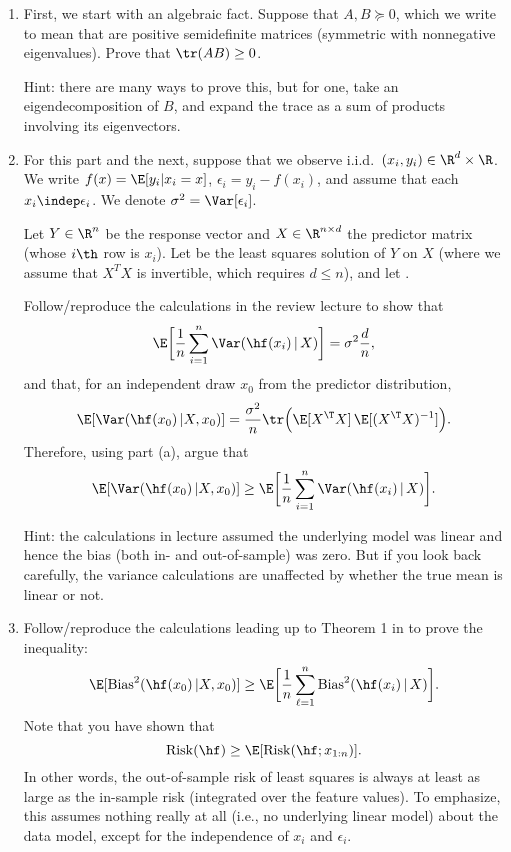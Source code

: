 \documentclass{article}
\begin{document}
\begin{enumerate}[label=(\alph*)]
\item First, we start with an algebraic fact. Suppose that $A,B \succeq 0$, 
  which we write to mean that are positive semidefinite matrices (symmetric with
  nonnegative eigenvalues). Prove that $\tr(AB) \geq 0$. 
  \marginpar{\small [2 pts]} 

  Hint: there are many ways to prove this, but for one, take an
  eigendecomposition of $B$, and expand the trace as a sum of products involving
  its eigenvectors. 

\item For this part and the next, suppose that we observe i.i.d.\ $(x_i,y_i) \in
  \R^d \times \R$. We write $f(x) = \E[y_i|x_i = x]$, $\epsilon_i = y_i -
  f(x_i)$, and assume that each $x_i \indep \epsilon_i$. We denote $\sigma^2 = 
  \Var[\epsilon_i]$. 

  Let $Y \in \R^n$ be the response vector and $X \in \R^{n \times d}$ the
  predictor matrix (whose $i\th$ row is $x_i$). Let  be the least squares solution of $Y$ on $X$ (where we 
  assume that $X^T X$ is invertible, which requires $d \leq n$), and let 
  .  

  Follow/reproduce the calculations in the review lecture to show that
  \marginpar{\small [3 pts]} 
  \[
  \E\bigg[ \frac{1}{n} \sum_{i=1}^n \Var(\hf(x_i) \,|\, X) \bigg] = \sigma^2   
  \frac{d}{n}, 
  \]
  and that, for an independent draw $x_0$ from the predictor distribution,
  \marginpar{\small [3 pts]} 
  \[
  \E[\Var(\hf(x_0) \, | X, x_0)] = \frac{\sigma^2}{n} \tr\Big(\E [X^\T X] \, \E
  [(X^\T X)^{-1}] \Big). 
  \]
  Therefore, using part (a), argue that
  \marginpar{\small [1 pt]}
  \[
  \E[\Var(\hf(x_0) \, | X, x_0)] \geq \E\bigg[ \frac{1}{n} \sum_{i=1}^n
  \Var(\hf(x_i) \,|\, X) \bigg]. 
  \]

  Hint: the calculations in lecture assumed the underlying model was linear and
  hence the bias (both in- and out-of-sample) was zero. But if you look back 
  carefully, the variance calculations are unaffected by whether the true mean
  is linear or not.    

\item Follow/reproduce the calculations leading up to Theorem 1 in
  \citet{rosset2020from} to prove the inequality: 
  \marginpar{\small [6 pts]} 
  \[
  \E[\Bias^2(\hf(x_0) \, | X, x_0)] \geq \E\bigg[ \frac{1}{n} \sum_{\ell=1}^n 
  \Bias^2(\hf(x_i) \,|\, X) \bigg].
  \]
  Note that you have shown that
  \[
  \Risk(\hf) \geq \E[\Risk(\hf; x_{1:n})].
  \]
  In other words, the out-of-sample risk of least squares is always at least as 
  large as the in-sample risk (integrated over the feature values). To
  emphasize, this assumes nothing really at all (i.e., no underlying linear
  model) about the data model, except for the independence of $x_i$ and
  $\epsilon_i$.   


\end{enumerate}
\end{document}
